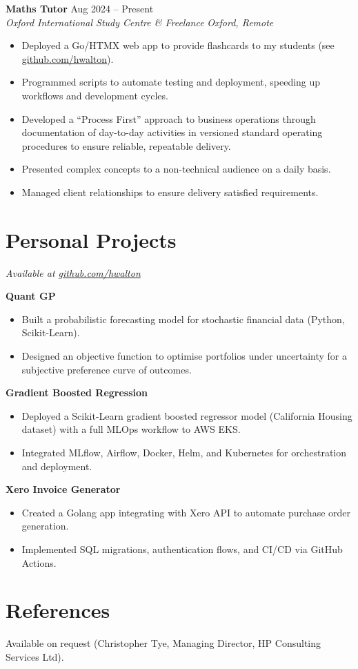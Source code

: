 \documentclass[a4paper,10pt]{article}
\newcommand{\resumeSubheading}[4]{
  \vspace{1pt}\textbf{#1} \hfill #2 \\
  \textit{#3} \hfill \textit{#4}
}
\newcommand{\resumeItem}[1]{\item{#1}}
\newcommand{\resumeItemListStart}{\begin{itemize}[leftmargin=*,itemsep=0pt,parsep=0pt]}
\newcommand{\resumeItemListEnd}{\end{itemize}\vspace{-3pt}}
\begin{document}
\resumeSubheading{Maths Tutor}{Aug 2024 -- Present}{Oxford International Study Centre \& Freelance}{Oxford, Remote}
\resumeItemListStart
\resumeItem{Deployed a Go/HTMX web app to provide flashcards to my students (see \href{https://github.com/hwalton/flashcard-app-showcase}{github.com/hwalton}).}
\resumeItem{Programmed scripts to automate testing and deployment, speeding up workflows and development cycles.}
\resumeItem{Developed a ``Process First'' approach to business operations through documentation of day-to-day activities in versioned standard operating procedures to ensure reliable, repeatable delivery.}
\resumeItem{Presented complex concepts to a non-technical audience on a daily basis.}
\resumeItem{Managed client relationships to ensure delivery satisfied requirements.}
\resumeItemListEnd


\section{Personal Projects}
\hfill\textit{Available at \href{https://github.com/hwalton}{github.com/hwalton}}

\textbf{Quant GP}
\resumeItemListStart
  \resumeItem{Built a probabilistic forecasting model for stochastic financial data (Python, Scikit-Learn).}
  \resumeItem{Designed an objective function to optimise portfolios under uncertainty for a subjective preference curve of outcomes.}
\resumeItemListEnd

\textbf{Gradient Boosted Regression}
\resumeItemListStart
  \resumeItem{Deployed a Scikit-Learn gradient boosted regressor model (California Housing dataset) with a full MLOps workflow to AWS EKS.}
  \resumeItem{Integrated MLflow, Airflow, Docker, Helm, and Kubernetes for orchestration and deployment.}
\resumeItemListEnd

\textbf{Xero Invoice Generator}
\resumeItemListStart
  \resumeItem{Created a Golang app integrating with Xero API to automate purchase order generation.}
  \resumeItem{Implemented SQL migrations, authentication flows, and CI/CD via GitHub Actions.}
\resumeItemListEnd

\section{References}
Available on request (Christopher Tye, Managing Director, HP Consulting Services Ltd).
\end{document}
